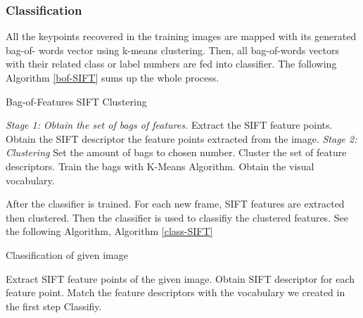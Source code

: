 \subsubsection{Classification} 
All the keypoints recovered in the training images are mapped with its generated bag-of-
words vector using k-means clustering. Then, all bag-of-words vectors with their related class or 
label numbers are fed into classifier. The following Algorithm \ref{bof-SIFT} sums up the whole process. \begin{algorithm}

\begin{dBox}
	\caption{Bag-of-Features SIFT Clustering} \label{bof-SIFT}
	\begin{algorithmic}[h]
				\vspace{1em}	
				\State \emph{Stage 1: Obtain the set of bags of features.}
						\State Extract the SIFT feature points.
						\State Obtain the SIFT descriptor the feature points extracted from the image.
					\EndFor
				\vspace{1em}	
				\State \emph{Stage 2: Clustering}
					\State Set the amount of bags to chosen number.
					\State Cluster the set of feature descriptors.
					\State Train the bags with K-Means Algorithm.
					\State Obtain the visual vocabulary.
		\EndProcedure	
	\end{algorithmic}
\end{dBox}	
\end{algorithm}
\bigskip
After the classifier is trained. For each new frame, SIFT features are extracted then clustered. Then the classifier is used to classifiy the clustered features. See the following Algorithm, Algorithm \ref{class-SIFT}
\begin{algorithm}[h]
\begin{dBox}
	\caption{Classification of given image} \label{class-SIFT}
	\begin{algorithmic}[1]
				\vspace{1em}	
				\State Extract SIFT feature points of the given image.
				\State Obtain SIFT descriptor for each feature point.
				\State Match the feature descriptors with the vocabulary we created in the first step
				\State Classifiy.

		\EndProcedure	
	\end{algorithmic}
\end{dBox}	
\end{algorithm}


